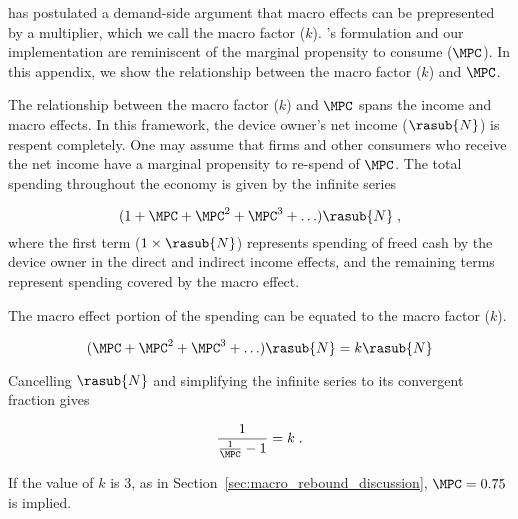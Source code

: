 
\citet{Borenstein:2015aa} has postulated a demand-side argument that macro effects 
can be prepresented by a multiplier, which we call the macro factor ($k$).
\citeauthor{Borenstein:2015aa}'s formulation and our implementation 
are reminiscent of the marginal propensity to consume ($\MPC$).
In this appendix, we show the relationship between the macro factor ($k$) and $\MPC$.

The relationship between the macro factor ($k$) and $\MPC$ spans
the income and macro effects.
In this framework, the device owner's net income ($\rasub{N}$) is respent completely.
One may assume that firms and other consumers who receive the net income have a 
marginal propensity to re-spend of $\MPC$.
The total spending throughout the economy is given by the infinite series

\begin{equation} \label{eq:infinite_series_spending}
  (1 + \MPC + \MPC^2 + \MPC^3 + \ldots) \rasub{N} \; ,
\end{equation}
%
where the first term ($1 \times \rasub{N}$) represents spending of freed cash by the device owner
in the direct and indirect income effects, and
the remaining terms represent spending covered by the macro effect.

The macro effect portion of the spending can be equated to the macro factor ($k$).

\begin{equation} \label{eq:mpc_and_k}
  (\MPC + \MPC^2 + \MPC^3 + \ldots) \rasub{N} = k \rasub{N}
\end{equation}

Cancelling $\rasub{N}$ and simplifying the infinite series to its convergent fraction gives

\begin{equation} \label{eq:mpc_and_k_converged}
  \frac{1}{\frac{1}{\MPC} - 1} = k \; .
\end{equation}

If the value of $k$ is 3, as in Section~\ref{sec:macro_rebound_discussion}, 
$\MPC = 0.75$ is implied.
